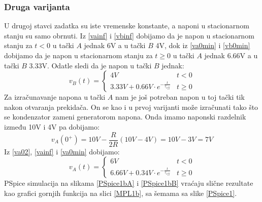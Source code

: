 \documentclass{article}
\begin{document}
            \subsubsection{Druga varijanta}
                U drugoj stavci zadatka su iste vremenske konstante, a naponi u stacionarnom stanju su samo obrnuti. Iz \eqref{vainf} i \eqref{vbinf} dobijamo da je napon u stacionarnom stanju za $t < 0$ u tački $A$ jednak 6V a u tački $B$ 4V, dok iz \eqref{va0min} i \eqref{vb0min} dobijamo da je napon u stacionarnom stanju za $t \geq 0$ u tački $A$ jednak 6.66V a u tački $B$ 3.33V. Odatle sledi da je napon u tački $B$ jednak:
                $$v_B(t) = \left\{ \begin{array}{ll}
                    4V & t < 0 \\
                    3.33V + 0.66V \cdot e^{-\frac{t}{\tau_{off}}} & t \geq 0
                \end{array}\right.$$
                Za izračunavanje napona u tački $A$ nam je još potreban napon u toj tački tik nakon otvaranja prekidača. On se kao i u prvoj varijanti može izračunati tako što se kondenzator zameni generatorom napona. Onda imamo naponski razdelnik između 10V i 4V pa dobijamo:
                \begin{equation}
                    \label{va02}
                    v_A(0^{+}) = 10V - \frac{R}{2R} (10V - 4V) = 10V - 3V = 7V
                \end{equation}
                Iz \eqref{va02}, \eqref{vainf} i \eqref{va0min} dobijamo:
                $$v_A(t) = \left\{ \begin{array}{ll}
                    6V & t < 0 \\
                    6.66V + 0.34V \cdot e^{-\frac{t}{\tau_{off}}} & t \geq 0
                \end{array}\right.$$
                PSpice simulacija na slikama \ref{PSpice1bA} i \ref{PSpice1bB} vraćaju slične rezultate kao grafici gornjih funkcija na slici \ref{MPL1b}, sa šemama sa slike \ref{PSpice1}.
\end{document}
